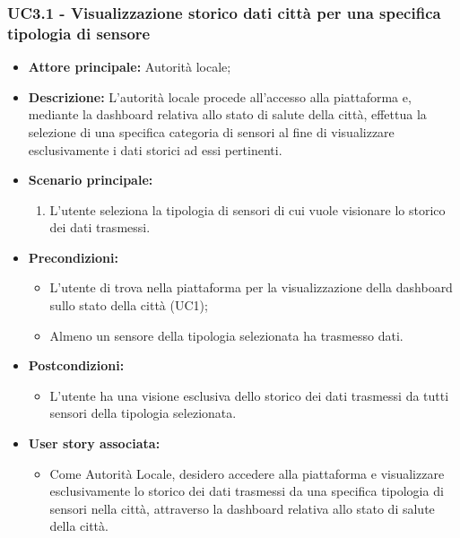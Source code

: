 \subsubsection{UC3.1 - Visualizzazione storico dati città per una specifica tipologia di sensore}
\begin{itemize}
    \item \textbf{Attore principale:} Autorità locale;
    \item \textbf{Descrizione:} L'autorità locale procede all'accesso alla piattaforma e, mediante la dashboard relativa allo stato di salute della città, effettua la selezione di una specifica categoria di sensori al fine di visualizzare esclusivamente i dati storici ad essi pertinenti.
    \item \textbf{Scenario principale:}
          \begin{enumerate}
              \item L'utente seleziona la tipologia di sensori di cui vuole visionare lo storico dei dati trasmessi.
          \end{enumerate}
    \item \textbf{Precondizioni:}
          \begin{itemize}
              \item  L'utente di trova  nella piattaforma per la visualizzazione della dashboard sullo stato della città (UC1);
              \item  Almeno un sensore della tipologia selezionata ha trasmesso dati.
          \end{itemize}
    \item \textbf{Postcondizioni:}
          \begin{itemize}
              \item  L'utente ha una visione esclusiva dello storico dei dati trasmessi da tutti sensori della tipologia selezionata.
          \end{itemize}
    \item \textbf{User story associata:}
          \begin{itemize}
              \item Come Autorità Locale, desidero accedere alla piattaforma e visualizzare esclusivamente lo storico dei dati trasmessi da una specifica tipologia di sensori nella città, attraverso la dashboard relativa allo stato di salute della città.
          \end{itemize}
\end{itemize}